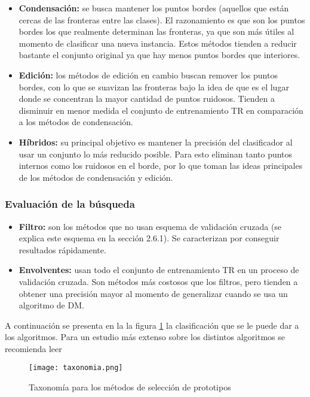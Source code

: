 \begin{itemize}
\item \textbf{Condensación:}
se busca mantener los puntos bordes (aquellos que están cercas de las fronteras entre las clases). El razonamiento es que son los puntos bordes los que realmente determinan las fronteras, ya que son más útiles al momento de clasificar una nueva instancia. Estos métodos tienden a reducir bastante el conjunto original ya que hay menos puntos bordes que interiores.

\item \textbf{Edición:}
los métodos de edición en cambio buscan remover los puntos bordes, con lo que se suavizan las fronteras bajo la idea de que es el lugar donde se concentran la mayor cantidad de puntos ruidosos. Tienden a disminuir en menor medida el conjunto de entrenamiento TR en comparación a los métodos de condensación.

\item \textbf{Híbridos:}
su principal objetivo es mantener la precisión del clasificador al usar un conjunto lo más reducido posible. Para esto eliminan tanto puntos internos como los ruidosos en el borde, por lo que toman las ideas principales de los métodos de condensación y edición.
\end{itemize}

\subsubsection{Evaluación de la búsqueda}

\begin{itemize}
\item \textbf{Filtro:}
son los métodos que no usan esquema de validación cruzada (se explica este esquema en la sección 2.6.1). Se caracterizan por conseguir resultados rápidamente. 

\item \textbf{Envolventes:}
usan todo el conjunto de entrenamiento TR en un proceso de validación cruzada. Son métodos más costosos que los filtros, pero tienden a obtener una precisión mayor al momento de generalizar cuando se usa un algoritmo de DM.
\end{itemize}

A continuación se presenta en la la figura \ref{taxonomia} la clasificación que se le puede dar a los algoritmos. Para un estudio más extenso sobre los distintos algoritmos se recomienda leer \cite{garcia2016data}

\begin{figure}[]
\centering
\texttt{[image: taxonomia.png]}
\caption[Taxonomía para los métodos de selección de prototipos]{Taxonomía para los métodos de selección de prototipos}
\label{taxonomia}
\end{figure}

